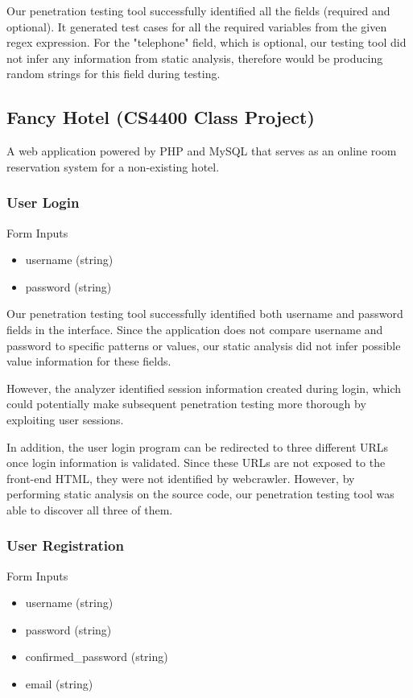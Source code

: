 Our penetration testing tool successfully identified all the fields (required and optional). It generated test cases for all the required variables from the given regex expression. For the "telephone" field, which is optional, our testing tool did not infer any information from static analysis, therefore would be producing random strings for this field during testing.

\subsection{Fancy Hotel (CS4400 Class Project)}
A web application powered by PHP and MySQL that serves as an online room reservation system for a non-existing hotel.

\subsubsection{User Login}
Form Inputs
\begin{itemize}
\item username (string)
\item password (string)
\end{itemize}

Our penetration testing tool successfully identified both username and password fields in the interface. Since the application does not compare username and password to specific patterns or values, our static analysis did not infer possible value information for these fields. 

However, the analyzer identified session information created during login, which could potentially make subsequent penetration testing more thorough by exploiting user sessions.

In addition, the user login program can be redirected to three different URLs once login information is validated. Since these URLs are not exposed to the front-end HTML, they were not identified by webcrawler. However, by performing static analysis on the source code, our penetration testing tool was able to discover all three of them.

\subsubsection{User Registration}
Form Inputs
\begin{itemize}
\item username (string)
\item password (string)
\item confirmed\_password (string)
\item email (string)
\end{itemize}

